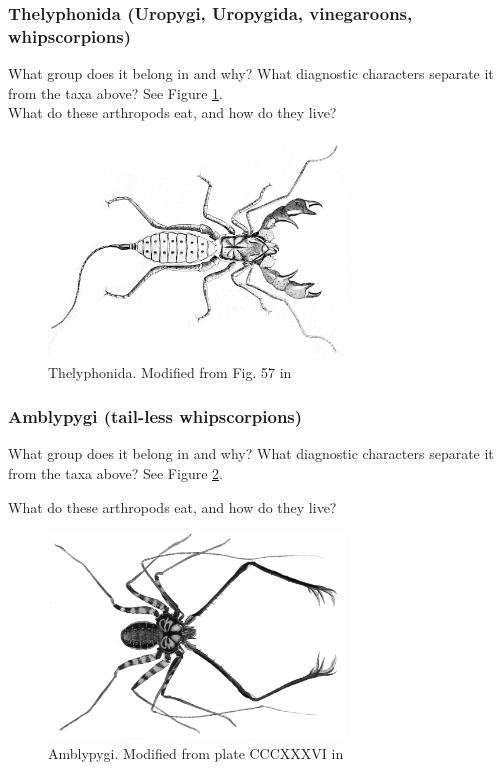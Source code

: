 \documentclass[letterpaper, 11pt]{article}
\begin{document}
\subsubsection*{Thelyphonida (Uropygi, Uropygida, vinegaroons, whipscorpions)}
What group does it belong in and why? What diagnostic characters separate it from the taxa above? See Figure \ref{fig:thelyphonida}.\\

\noindent{}What do these arthropods eat, and how do they live?\vspace{2cm}

\begin{figure}[ht!]
  \centering
    \includegraphics[width=0.7\textwidth]{thelyphonida.png}
  \caption{Thelyphonida. Modified from Fig. 57 in \cite{bhlitem40112britmus}}
  \label{fig:thelyphonida}
\end{figure}

\subsubsection*{Amblypygi (tail-less whipscorpions)}
What group does it belong in and why? What diagnostic characters separate it from the taxa above? See Figure \ref{fig:ambly1}.\vspace{2cm}

\noindent{}What do these arthropods eat, and how do they live?\vspace{2cm}

\begin{figure}[ht!]
  \centering
    \includegraphics[width=0.7\textwidth]{amblypygi.png}
  \caption{Amblypygi. Modified from plate CCCXXXVI in \cite{bhlitem55834arach}}
  \label{fig:ambly1}
\end{figure}
\end{document}
